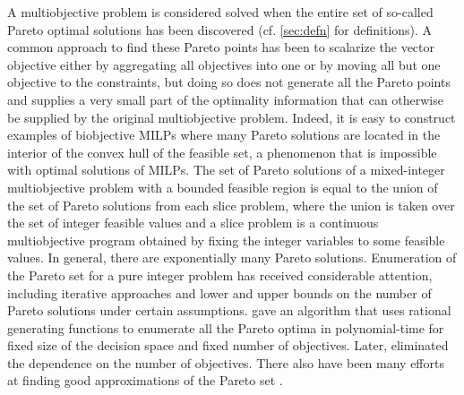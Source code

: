 \documentclass[11.5pt]{article}
\begin{document}
A multiobjective problem is considered solved when the entire set of so-called Pareto optimal solutions has been discovered (cf. \textsection\ref{sec:defn} for definitions). A common approach to find these Pareto points has been to scalarize the vector objective \citep{ehrgott2006discussion} either by aggregating all objectives into one or by moving all but one objective to the constraints, but doing so does not generate all the Pareto points and supplies a very small part of the optimality information that can otherwise be supplied by the original multiobjective problem. Indeed, it is easy to construct examples of biobjective MILPs where many  Pareto solutions are located in the interior of the convex hull of the feasible set, a phenomenon that is impossible with optimal solutions of MILPs. The set of Pareto solutions of a mixed-integer multiobjective problem with a bounded feasible region is equal to the union of the set of Pareto solutions from each slice problem, where the union is taken over the set of integer feasible values and a slice problem is a continuous multiobjective program obtained by fixing the integer variables to some feasible values. In general, there are exponentially many Pareto solutions. Enumeration of the Pareto set for a pure integer problem has received considerable attention, including iterative approaches  \citep{lokman,ozpeynirci2010exact} and lower and upper bounds on the number of Pareto solutions \citep{bazgan2013number,stanojevic2013cardinality} under certain assumptions. \citet{de2009pareto} gave an algorithm that uses rational generating functions to enumerate all the Pareto optima in polynomial-time for fixed size of the decision space and fixed number of objectives. Later, \citet{blanco2012complexity} eliminated the dependence on the number of objectives. There also have been many efforts at finding good approximations of the Pareto set \citep{bazgan2015approximate,grandoni2014new,ruzika2005approximation,sayin2000measuring,sayin2003procedure}.
\end{document}
